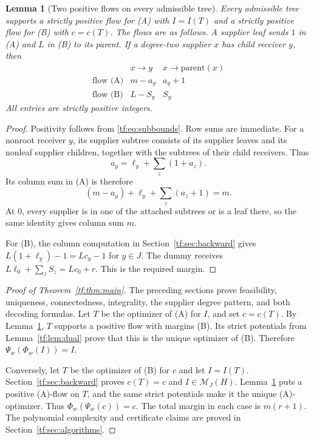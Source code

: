 \documentclass[11pt]{article}
\numberwithin{equation}{section}
\newtheorem{lemma}[theorem]{Lemma}
\theoremstyle{definition}
\newcommand{\PM}{\mathcal M}
\begin{document}
\begin{lemma}[Two positive flows on every admissible tree]
\label{tf:lem:twoflows}
Every admissible tree supports a strictly positive flow for (A) with
$I=I(T)$ and a strictly positive flow for (B) with $c=c(T)$. The flows
are as follows. A supplier leaf sends $1$ in (A) and $L$ in (B) to its
parent. If a degree-two supplier $x$ has child receiver $y$, then
\begin{equation}
\begin{array}{c|cc}
 &x\longrightarrow y&x\longrightarrow\text{parent}(x)\\\hline
 \text{flow (A)}&m-a_y&a_y+1\\
 \text{flow (B)}&L-S_y&S_y
\end{array}
\label{tf:eq:twoflowtable}
\end{equation}
All entries are strictly positive integers.
\end{lemma}
\begin{proof}
Positivity follows from \eqref{tf:eq:subbounds}. Row sums are immediate.
For a nonroot receiver $y$, its supplier subtree consists of its supplier
leaves and its nonleaf supplier children, together with the subtrees of
their child receivers. Thus
\[
 a_y=\ell_y+\sum_z(1+a_z).
\]
Its column sum in (A) is therefore
\[
 (m-a_y)+\ell_y+\sum_z(a_z+1)=m.
\]
At $0$, every supplier is in one of the attached subtrees or is a leaf
there, so the same identity gives column sum $m$.

For (B), the column computation in Section~\ref{tf:sec:backward} gives
$L(1+\ell_y)-1=Lc_y-1$ for $y\in J$. The dummy receives
$L\ell_0+\sum_zS_z=Lc_0+r$. This is the required margin.
\end{proof}

\begin{proof}[Proof of Theorem~\ref{tf:thm:main}]
The preceding sections prove feasibility, uniqueness, connectedness,
integrality, the supplier degree pattern, and both decoding formulas.
Let $T$ be the optimizer of (A) for $I$, and set $c=c(T)$. By
Lemma~\ref{tf:lem:twoflows}, $T$ supports a positive flow with margins (B).
Its strict potentials from Lemma~\ref{tf:lem:dual} prove that this is the
unique optimizer of (B). Therefore $\Psi_w(\Phi_w(I))=I$.

Conversely, let $T$ be the optimizer of (B) for $c$ and let $I=I(T)$.
Section~\ref{tf:sec:backward} proves $c(T)=c$ and $I\in\PM_J(H)$.
Lemma~\ref{tf:lem:twoflows} puts a positive (A)-flow on $T$, and the same
strict potentials make it the unique (A)-optimizer. Thus
$\Phi_w(\Psi_w(c))=c$. The total margin in each case is $m(r+1)$.
The polynomial complexity and certificate claims are proved in
Section~\ref{tf:sec:algorithms}.
\end{proof}
\end{document}
